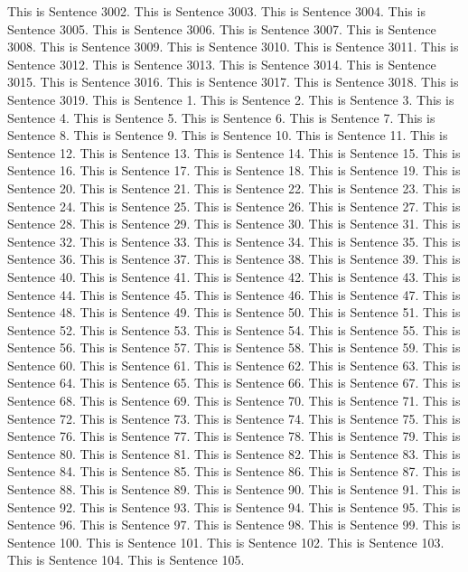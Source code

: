 \documentclass{article}
\begin{document}
This is Sentence 3002.
This is Sentence 3003.
This is Sentence 3004.
This is Sentence 3005.
This is Sentence 3006.
This is Sentence 3007.
This is Sentence 3008.
This is Sentence 3009.
This is Sentence 3010.
This is Sentence 3011.
This is Sentence 3012.
This is Sentence 3013.
This is Sentence 3014.
This is Sentence 3015.
This is Sentence 3016.
This is Sentence 3017.
This is Sentence 3018.
This is Sentence 3019.
This is Sentence 1.
This is Sentence 2.
This is Sentence 3.
This is Sentence 4.
This is Sentence 5.
This is Sentence 6.
This is Sentence 7.
This is Sentence 8.
This is Sentence 9.
This is Sentence 10.
This is Sentence 11.
This is Sentence 12.
This is Sentence 13.
This is Sentence 14.
This is Sentence 15.
This is Sentence 16.
This is Sentence 17.
This is Sentence 18.
This is Sentence 19.
This is Sentence 20.
This is Sentence 21.
This is Sentence 22.
This is Sentence 23.
This is Sentence 24.
This is Sentence 25.
This is Sentence 26.
This is Sentence 27.
This is Sentence 28.
This is Sentence 29.
This is Sentence 30.
This is Sentence 31.
This is Sentence 32.
This is Sentence 33.
This is Sentence 34.
This is Sentence 35.
This is Sentence 36.
This is Sentence 37.
This is Sentence 38.
This is Sentence 39.
This is Sentence 40.
This is Sentence 41.
This is Sentence 42.
This is Sentence 43.
This is Sentence 44.
This is Sentence 45.
This is Sentence 46.
This is Sentence 47.
This is Sentence 48.
This is Sentence 49.
This is Sentence 50.
This is Sentence 51.
This is Sentence 52.
This is Sentence 53.
This is Sentence 54.
This is Sentence 55.
This is Sentence 56.
This is Sentence 57.
This is Sentence 58.
This is Sentence 59.
This is Sentence 60.
This is Sentence 61.
This is Sentence 62.
This is Sentence 63.
This is Sentence 64.
This is Sentence 65.
This is Sentence 66.
This is Sentence 67.
This is Sentence 68.
This is Sentence 69.
This is Sentence 70.
This is Sentence 71.
This is Sentence 72.
This is Sentence 73.
This is Sentence 74.
This is Sentence 75.
This is Sentence 76.
This is Sentence 77.
This is Sentence 78.
This is Sentence 79.
This is Sentence 80.
This is Sentence 81.
This is Sentence 82.
This is Sentence 83.
This is Sentence 84.
This is Sentence 85.
This is Sentence 86.
This is Sentence 87.
This is Sentence 88.
This is Sentence 89.
This is Sentence 90.
This is Sentence 91.
This is Sentence 92.
This is Sentence 93.
This is Sentence 94.
This is Sentence 95.
This is Sentence 96.
This is Sentence 97.
This is Sentence 98.
This is Sentence 99.
This is Sentence 100.
This is Sentence 101.
This is Sentence 102.
This is Sentence 103.
This is Sentence 104.
This is Sentence 105.
\end{document}
